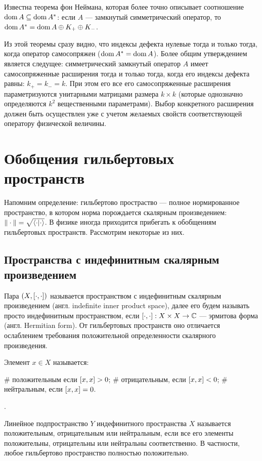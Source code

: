 Известна теорема фон Неймана, которая более точно описывает соотношение $\operatorname{dom} A \subseteq \operatorname{dom} A^*$: если $A$ — замкнутый симметрический оператор, то $\operatorname{dom} A^* = \operatorname{dom} A \oplus K_+ \oplus K_-$.

Из этой теоремы сразу видно, что индексы дефекта нулевые тогда и только тогда, когда оператор самосопряжен ($\operatorname{dom} A^* = \operatorname{dom} A$). Более общим утверждением является следущее: симметрический замкнутый оператор $A$ имеет самосопряженные расширения тогда и только тогда, когда его индексы дефекта равны: $k_+ = k_- = k$. При этом его все его самосопряженные расширения параметризуются унитарными матрицами размера $k \times k$ (которые однозначно определяются $k^2$ вещественными параметрами). Выбор конкретного расширения должен быть осуществлен уже с учетом желаемых свойств соответствующей оператору физической величины.
\section{Обобщения гильбертовых пространств}
Напомним определение: гильбертово простраство — полное нормированное пространство, в котором норма порождается скалярным произведением: $\|\cdot\| = \sqrt{\ip{\cdot}{\cdot}}$. В физике иногда приходится прибегать к обобщениям гильбертовых пространств. Рассмотрим некоторые из них.

\subsection{Пространства с индефинитным скалярным произведением}
Пара $(X, [\cdot,\cdot])$ называется пространством с индефинитным скалярным произведением (англ. indefinite inner product space), далее его будем называть просто индефинитным пространством, если $[\cdot,\cdot]: X \times X \to \mathbb{C}$ — эрмитова форма (англ. Hermitian form). От гильбертовых пространств оно отличается ослаблением требования положительной определенности скалярного произведения.

Элемент $x \in X$ называется:
\begin{ilist}
# положительным если $[x,x] > 0$;
# отрицательным, если $[x,x] < 0$;
# нейтральным, если $[x,x] = 0$.
\end{ilist}.

Линейное подпространство $Y$ индефинитного пространства $X$ называется положительным, отрицательным или нейтральным, если все его элементы положительны, отрицательны или нейтральны соответственно. В частности, любое гильбертово пространство полностью положительно.

